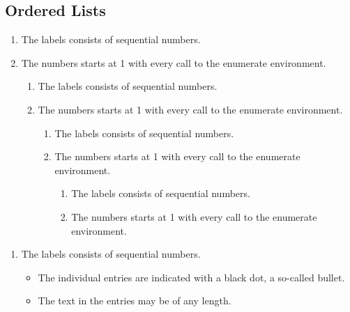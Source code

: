 \documentclass{article} %
\begin{document}
{\subsection{Ordered Lists}
\begin{enumerate} 
\item The labels consists of sequential numbers. 
\item The numbers starts at 1 with every call to the enumerate environment. 
\begin{enumerate} 
\item The labels consists of sequential numbers. 
\item The numbers starts at 1 with every call to the enumerate environment. 
\begin{enumerate} 
\item The labels consists of sequential numbers. 
\item The numbers starts at 1 with every call to the enumerate environment. 
\begin{enumerate} 
\item The labels consists of sequential numbers. 
\item The numbers starts at 1 with every call to the enumerate environment. 
\end{enumerate} 
\end{enumerate} 
\end{enumerate} 
\end{enumerate} 

\begin{enumerate}
\item The labels consists of sequential numbers. 
\begin{itemize} 
\item The individual entries are indicated with a black dot, a so-called bullet. 
\item The text in the entries may be of any length. 
\end{itemize} 
\end{enumerate} 
}
\end{document}
